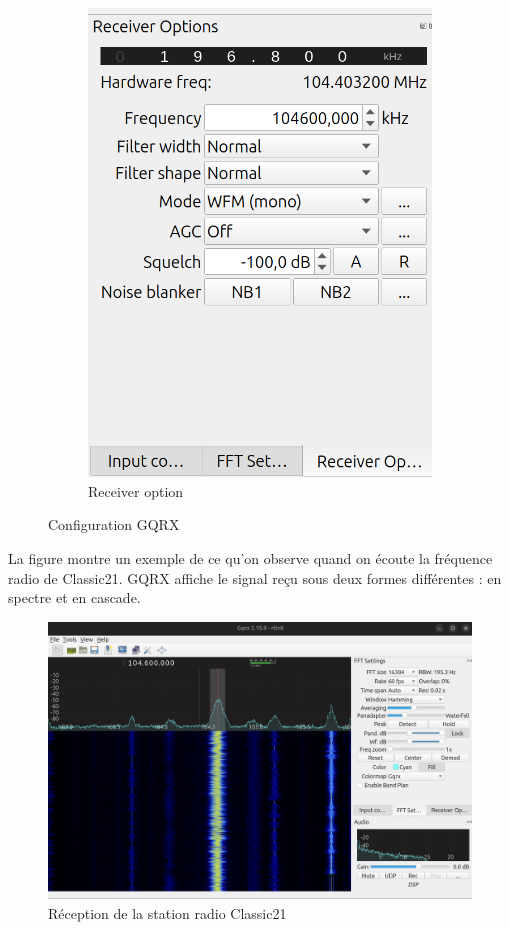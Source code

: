\begin{figure}[h]
\begin{subfigure}{0.4\textwidth}
  \includegraphics[width=\textwidth]{images/gqrx3.png}
  \caption{Receiver option}
  \label{term341}
\end{subfigure}
\caption{Configuration GQRX}
\label{term37}
\end{figure}

La figure montre un exemple de ce qu'on observe quand on écoute la fréquence radio de Classic21. GQRX affiche le signal reçu sous deux formes différentes : en spectre et en cascade.

\begin{figure}[h]
\centering

\includegraphics[scale=0.2]{images/gqrx1.png}
\caption{Réception de la station radio Classic21}\label{term38}
\end{figure}

